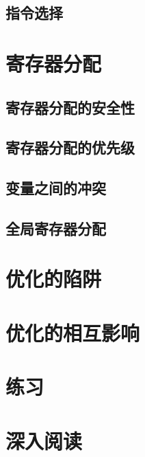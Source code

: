 \documentclass[cn,11pt,chinese]{elegantbook}
\begin{document}
\subsection{指令选择}

\section{寄存器分配}

\subsection{寄存器分配的安全性}

\subsection{寄存器分配的优先级}

\subsection{变量之间的冲突}

\subsection{全局寄存器分配}

\section{优化的陷阱}

\section{优化的相互影响}

\section{练习}

\section{深入阅读}
\end{document}

